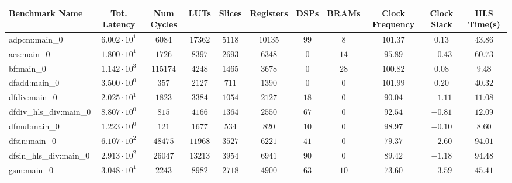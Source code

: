 \begin{tabular}{|l|c|c|c|c|c|c|c|c|c|c|}
\hline
Benchmark Name          & Tot. Latency           & Num Cycles & LUTs       & Slices    & Registers & DSPs    & BRAMs   & Clock Frequency & Clock Slack & HLS Time(s) \\
\hline
adpcm:main\_0           & $ 6.002 \cdot 10^{1} $ & $ 6084   $ & $ 17362  $ & $ 5118  $ & $ 10135 $ & $ 99  $ & $ 8   $ & $ 101.37      $ & $ 0.13    $ & $ 43.86   $ \\
aes:main\_0             & $ 1.800 \cdot 10^{1} $ & $ 1726   $ & $ 8397   $ & $ 2693  $ & $ 6348  $ & $ 0   $ & $ 14  $ & $ 95.89       $ & $ -0.43   $ & $ 60.73   $ \\
bf:main\_0              & $ 1.142 \cdot 10^{3} $ & $ 115174 $ & $ 4248   $ & $ 1465  $ & $ 3678  $ & $ 0   $ & $ 28  $ & $ 100.82      $ & $ 0.08    $ & $ 9.48    $ \\
dfadd:main\_0           & $ 3.500 \cdot 10^{0} $ & $ 357    $ & $ 2127   $ & $ 711   $ & $ 1390  $ & $ 0   $ & $ 0   $ & $ 101.99      $ & $ 0.20    $ & $ 40.32   $ \\
dfdiv:main\_0           & $ 2.025 \cdot 10^{1} $ & $ 1823   $ & $ 3384   $ & $ 1054  $ & $ 2127  $ & $ 18  $ & $ 0   $ & $ 90.04       $ & $ -1.11   $ & $ 11.08   $ \\
dfdiv\_hls\_div:main\_0 & $ 8.807 \cdot 10^{0} $ & $ 815    $ & $ 4166   $ & $ 1364  $ & $ 2550  $ & $ 67  $ & $ 0   $ & $ 92.54       $ & $ -0.81   $ & $ 12.09   $ \\
dfmul:main\_0           & $ 1.223 \cdot 10^{0} $ & $ 121    $ & $ 1677   $ & $ 534   $ & $ 820   $ & $ 10  $ & $ 0   $ & $ 98.97       $ & $ -0.10   $ & $ 8.60    $ \\
dfsin:main\_0           & $ 6.107 \cdot 10^{2} $ & $ 48475  $ & $ 11968  $ & $ 3527  $ & $ 6221  $ & $ 41  $ & $ 0   $ & $ 79.37       $ & $ -2.60   $ & $ 94.01   $ \\
dfsin\_hls\_div:main\_0 & $ 2.913 \cdot 10^{2} $ & $ 26047  $ & $ 13213  $ & $ 3954  $ & $ 6941  $ & $ 90  $ & $ 0   $ & $ 89.42       $ & $ -1.18   $ & $ 94.48   $ \\
gsm:main\_0             & $ 3.048 \cdot 10^{1} $ & $ 2243   $ & $ 8982   $ & $ 2718  $ & $ 4900  $ & $ 63  $ & $ 10  $ & $ 73.60       $ & $ -3.59   $ & $ 45.41   $ \\

\end{tabular}
